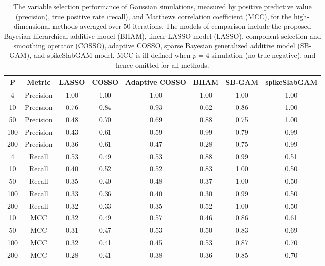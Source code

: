 \begin{table}[ht]
\centering
\begin{tabular}{cccccccc}
  \hline
P & Metric & LASSO & COSSO & Adaptive COSSO & BHAM & SB-GAM & spikeSlabGAM \\ 
  \hline
  4 & Precision & 1.00 & 1.00 & 1.00 & 1.00 & 1.00 & 1.00 \\ 
   10 & Precision & 0.76 & 0.84 & 0.93 & 0.62 & 0.86 & 1.00 \\ 
   50 & Precision & 0.48 & 0.70 & 0.69 & 0.88 & 0.75 & 1.00 \\ 
  100 & Precision & 0.43 & 0.61 & 0.59 & 0.99 & 0.79 & 0.99 \\ 
  200 & Precision & 0.36 & 0.61 & 0.47 & 0.28 & 0.75 & 0.99 \\ 
   \hline
  4 & Recall & 0.53 & 0.49 & 0.53 & 0.88 & 0.99 & 0.51 \\ 
   10 & Recall & 0.40 & 0.52 & 0.52 & 0.83 & 1.00 & 0.50 \\ 
   50 & Recall & 0.35 & 0.40 & 0.48 & 0.37 & 1.00 & 0.50 \\ 
  100 & Recall & 0.33 & 0.36 & 0.40 & 0.30 & 0.99 & 0.50 \\ 
  200 & Recall & 0.32 & 0.33 & 0.35 & 0.52 & 1.00 & 0.50 \\ 
   \hline
 10 & MCC & 0.32 & 0.49 & 0.57 & 0.46 & 0.86 & 0.61 \\ 
   50 & MCC & 0.31 & 0.47 & 0.53 & 0.50 & 0.83 & 0.69 \\ 
  100 & MCC & 0.32 & 0.41 & 0.45 & 0.53 & 0.87 & 0.70 \\ 
  200 & MCC & 0.28 & 0.41 & 0.38 & 0.36 & 0.85 & 0.70 \\ 
   \hline
\end{tabular}
\caption{The variable selection performance of Gaussian simulations,
                         measured by positive predictive value (precision), true positive rate (recall),
                         and Matthews correlation coefficient (MCC), for the high-dimensional methods
                         averaged over 50 iterations. The models of comparison include the proposed Bayesian
                         hierarchical additive model (BHAM), linear LASSO model (LASSO), component selection
                         and smoothing operator (COSSO), adaptive COSSO, sparse Bayesian generalized additive
                         model (SB-GAM), and spikeSlabGAM model. MCC is ill-defined when $p=4$ simulation
                         (no true negative), and hence omitted for all methods.} 
\label{tab:sim_gaus_var_select}
\end{table}
